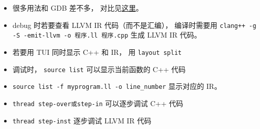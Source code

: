 
\begin{issues}
\issueDraft
\end{issues}


\begin{itemize}
\item 很多用法和 GDB 差不多， 对比见\href{https://lldb.llvm.org/use/map.html}{这里}。
\item debug 时若要查看 LLVM IR 代码（而不是汇编）， 编译时需要用 \verb|clang++ -g -S -emit-llvm -o 程序.ll 程序.cpp| 生成 LLVM IR 代码。
\item 若要用 TUI 同时显示 C++ 和 IR， 用 \verb|layout split|
\item 调试时， \verb|source list| 可以显示当前函数的 C++ 代码
\item \verb|source list -f myprogram.ll -o line_number| 显示对应的 IR。
\item \verb|thread step-over或step-in| 可以逐步调试 C++ 代码
\item \verb|thread step-inst| 逐步调试 LLVM IR 代码
\end{itemize}
